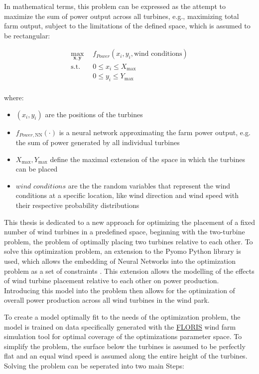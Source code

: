 In mathematical terms, this problem can be expressed as the attempt to maximize the sum of power output across all turbines, e.g., maximizing total farm output, subject to the limitations of the defined space, which is assumed to be rectangular: 

\begin{align}
	\max_{\mathbf{x}, \mathbf{y}} & f_{Power}(x_i, y_i, \text{wind conditions}) \\
	\text{s.t.} \quad 
	&  0 \leq x_i \leq X_{\max} \\
	&  0 \leq y_i \leq Y_{\max} \\
\end{align}

where:
\begin{itemize}
	\item \( (x_i,  y_i) \) are the positions of the turbines
	\item \( f_{Power, \text{NN}}(\cdot)\) is a neural network approximating the farm power output, e.g. the sum of power generated by all individual turbines
	\item \(  X_{\max}, Y_{\max} \) define the maximal extension of the space in which the turbines can be placed
	\item \(\textit{wind conditions}\) are the the random variables that represent the wind conditions at a specific location, like wind direction and wind speed with their respective probability distributions 
\end{itemize}


This thesis is dedicated to a new approach for optimizing the placement of a fixed number of wind turbines in a predefined space, beginning with the two-turbine problem, the problem of optimally placing two turbines relative to each other. To solve this optimization problem, an extension to the Pyomo Python library is used, which allows the embedding of Neural Networks into the optimization problem as a set of constraints \cite{ALCANTARA2023120895}. This extension allows the modelling of the effects of wind turbine placement relative to each other on power production. Introducing this model into the problem then allows for the optimization of overall power production across all wind turbines in the wind park.

To create a model optimally fit to the needs of the optimization problem, the model is trained on data specifically generated with the \href{https://www.nrel.gov/wind/floris.html}{FLORIS} \cite{nrel_floris} wind farm simulation tool  for optimal coverage of the optimizations parameter space. To simplify the problem, the surface below the turbines is assumed to be perfectly flat and an equal wind speed is assumed along the entire height of the turbines. Solving the problem can be seperated into two main Steps:

